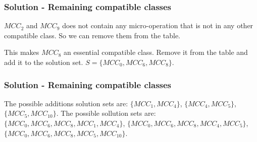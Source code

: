 \begin{frame}
    \frametitle{Solution - Remaining compatible classes}
    $MCC_{2}$ and $MCC_{9}$ does not contain any micro-operation that is not in any other compatible class. So we can remove them from the table.   
    \begin{table}
    \end{table}
    This makes $MCC_{8}$ an essential compatible class. Remove it from the table and add it to the solution set.
    $S = \{MCC_{0}, MCC_{6}, MCC_{8}\}$.
\end{frame}

\begin{frame}
    \frametitle{Solution - Remaining compatible classes}
    \begin{table}
    \end{table}
    The possible additions solution sets are: $\{MCC_{1}, MCC_{4}\}$, $\{MCC_{4}, MCC_{5}\}$, $\{MCC_{5}, MCC_{10}\}$.
    The possible sollution sets are: $\{MCC_{0}, MCC_{6}, MCC_{8}, MCC_{1}, MCC_{4}\}$, $\{MCC_{0}, MCC_{6}, MCC_{8}, MCC_{4}, MCC_{5}\}$, $\{MCC_{0}, MCC_{6}, MCC_{8}, MCC_{5}, MCC_{10}\}$.
\end{frame}

